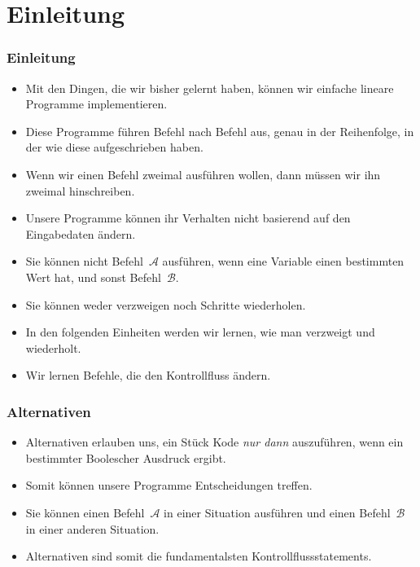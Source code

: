 \documentclass[aspectratio=169,mathserif,notheorems]{beamer}%
\subtitle{22.~Alternativen~mit~\texttt{if}}%
\begin{document}
%
%
\startPresentation%
%
\section{Einleitung}%
\begin{frame}[t]%
\frametitle{Einleitung}%
%
\begin{itemize}%
\item Mit den Dingen, die wir bisher gelernt haben, können wir einfache lineare Programme implementieren.%
\item<2-> Diese Programme führen Befehl nach Befehl aus, genau in der Reihenfolge, in der wie diese aufgeschrieben haben.%
\item<3-> Wenn wir einen Befehl zweimal ausführen wollen, dann müssen wir ihn zweimal hinschreiben.%
\item<4-> Unsere Programme können ihr Verhalten nicht basierend auf den Eingabedaten ändern.%
\item<5-> Sie können nicht Befehl~$\mathcal{A}$ ausführen, wenn eine Variable einen bestimmten Wert hat, und sonst Befehl~$\mathcal{B}$.%
\item<6-> Sie können weder verzweigen noch Schritte wiederholen.%
\item<7-> In den folgenden Einheiten werden wir lernen, wie man verzweigt und wiederholt.%
\item<8-> Wir lernen Befehle, die den Kontrollfluss ändern.%
%
\end{itemize}%
\end{frame}%
%
\begin{frame}%
\frametitle{Alternativen}%
\begin{itemize}%
\item Alternativen erlauben uns, ein Stück Kode \emph{nur dann} auszuführen, wenn ein bestimmter Boolescher Ausdruck  ergibt.%
%
\item<2-> Somit können unsere Programme Entscheidungen treffen.%
%
\item<3-> Sie können einen Befehl~$\mathcal{A}$ in einer Situation ausführen und einen Befehl~$\mathcal{B}$ in einer anderen Situation.%
%
\item<4-> Alternativen sind somit die fundamentalsten Kontrollflussstatements.%
\end{itemize}%
\end{frame}%
%
\end{document}
